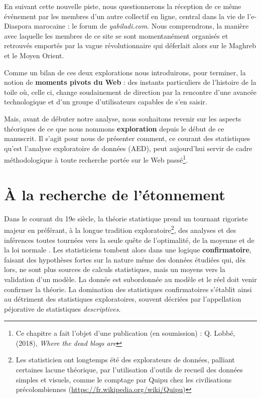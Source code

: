 \documentclass[symmetric,justified,marginals=raggedouter]{tufte-book}
\begin{document}
En suivant cette nouvelle piste, nous questionnerons la réception de ce même événement par les membres d'un autre collectif en ligne, central dans la vie de l'e-Diaspora marocaine : le forum de \textit{yabiladi.com}. Nous comprendrons, la manière avec laquelle les membres de ce site se sont momentanément organisés et retrouvés emportés par la vague révolutionnaire qui déferlait alors sur le Maghreb et le Moyen Orient. 

Comme un bilan de ces deux explorations nous introduirons, pour terminer, la notion de \textbf{moments pivots du Web} : des instants particuliers de l'histoire de la toile où, celle ci, change soudainement de direction par la rencontre d'une avancée technologique et d'un groupe d'utilisateurs capables de s'en saisir.

Mais, avant de débuter notre analyse, nous souhaitons revenir sur les aspects théoriques de ce que nous nommons \textbf{exploration} depuis le début de ce manuscrit. Il s'agit pour nous de présenter comment, ce courant des statistiques qu'est l'analyse exploratoire de données (AED), peut aujourd'hui servir de cadre méthodologique à toute re\-cherche portée sur le Web passé\footnote{Ce chapitre a fait l'objet d'une publication (en soumission) : Q. Lobbé, (2018), \textit{Where the dead blogs are}}.\\

\section{À la recherche de l'étonnement}
\label{sec:6_eda}

\noindent Dans le courant du 19e siècle, la théorie statistique prend un tournant rigoriste majeur en préférant, à la longue tradition exploratoire\footnote{Les statisticien ont longtemps été des explorateurs de données, palliant certaines lacune théorique, par l'utilisation d'outils de recueil des données simples et visuels, comme le comptage par Quipu chez les civilisations précolombiennes (\url{https://fr.wikipedia.org/wiki/Quipu})}, des analyses et des inférences toutes tournées vers la seule quête de l'optimalité, de la moyenne et de la loi normale \citep{ladiray_laed_1997}. Les statisticiens tombent alors dans une logique \textbf{confirmatoire}, faisant des hypothèses fortes sur la nature même des données étudiées qui, dès lors, ne sont plus sources de calculs statistiques, mais un moyens vers la validation d'un modèle. La donnée est subordonnée au modèle et le réel doit venir confirmer la théorie. La domination des statistiques confirmatoires s'établit ainsi au détriment des statistiques exploratoires, souvent décriées par l'appellation péjorative de statistiques \textit{descriptives}.
\end{document}
